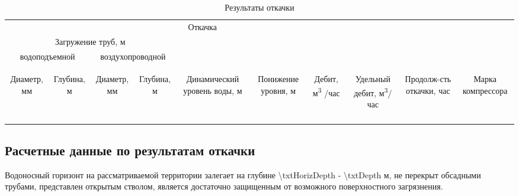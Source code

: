 \begin{table}[!h]
	\caption{Результаты откачки}
	\centering\begin{tabular}{|c|c|c|c|c|c|c|c|c|c|}
	\hline 
	\multicolumn{8}{|c|}{Откачка}&  &  \\ 
	\cline{1-8} 
	\multicolumn{4}{|c|}{Загружение труб, м} &  &  &  &  &  &  \\ 
	\cline{1-4} 
	\multicolumn{2}{|c|}{водоподъемной} & \multicolumn{2}{c|}{воздухопроводной} &  &  &  &  &  & \\ 
	\cline{1-4} 
	\begin{sideways}Диаметр, мм\end{sideways} &
	\begin{sideways}Глубина, м\end{sideways} &
	\begin{sideways}Диаметр, мм\end{sideways} &
	\begin{sideways}Глубина, м\end{sideways} &
	\begin{sideways}Динамический уровень воды, м\end{sideways} &
	\begin{sideways}Понижение уровня, м\end{sideways} &
	\begin{sideways}Дебит, м\textsuperscript{3} /час\end{sideways} &
	\begin{sideways}Удельный дебит, м\textsuperscript{3}/час \end{sideways} &
	\begin{sideways}Продолж-сть откачки, час\end{sideways} &
	\begin{sideways}Марка компрессора\end{sideways} \\ 
	\hline 
	\txtPumpResults \\ 
	\hline 
\end{tabular} 
\end{table}

\subsection{Расчетные данные по результатам откачки}

Водоносный горизонт на рассматриваемой территории залегает на глубине 	{\num{\txtHorizDepth}} - {\num{\txtDepth}}	м, не перекрыт обсадными трубами, представлен открытым стволом, является достаточно защищенным от возможного поверхностного загрязнения.

